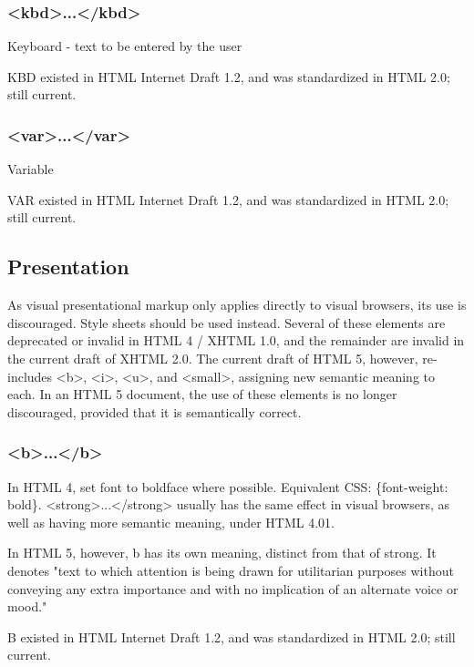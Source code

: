 \subsubsection{<kbd>...</kbd>}


Keyboard - text to be entered by the user

KBD existed in HTML Internet Draft 1.2, and was standardized in HTML 2.0; still current.


\subsubsection{<var>...</var>}


Variable

VAR existed in HTML Internet Draft 1.2, and was standardized in HTML 2.0; still current.





\subsection{Presentation}

As visual presentational markup only applies directly to visual browsers, its use is discouraged. Style sheets should be used instead. Several of these elements are deprecated or invalid in HTML 4 / XHTML 1.0, and the remainder are invalid in the current draft of XHTML 2.0. The current draft of HTML 5, however, re-includes <b>, <i>, <u>, and <small>, assigning new semantic meaning to each. In an HTML 5 document, the use of these elements is no longer discouraged, provided that it is semantically correct.


\subsubsection{<b>...</b>}

In HTML 4, set font to boldface where possible. Equivalent CSS: \{font-weight: bold\}. <strong>...</strong> usually has the same effect in visual browsers, as well as having more semantic meaning, under HTML 4.01.

In HTML 5, however, b has its own meaning, distinct from that of strong. It denotes "text to which attention is being drawn for utilitarian purposes without conveying any extra importance and with no implication of an alternate voice or mood."

B existed in HTML Internet Draft 1.2, and was standardized in HTML 2.0; still current.


